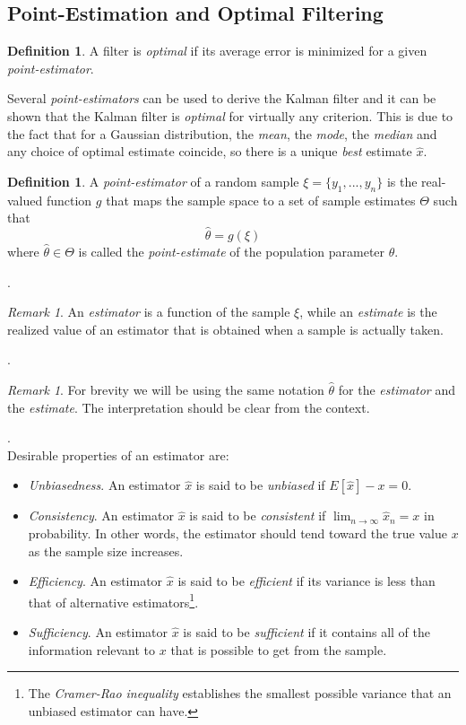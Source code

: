 \documentclass{article}
\theoremstyle{definition}
\newtheorem{definition}[thm]{Definition}
\theoremstyle{remark}
\newtheorem{remark}[thm]{Remark}
\begin{document}
\subsection{Point-Estimation and Optimal Filtering}\label{sec:opfilt}
\begin{definition}
A filter is \emph{optimal} if its average error is minimized for a given \emph{point-estimator}. 
\end{definition}

Several \emph{point-estimators} can be used to derive the Kalman filter and it can be shown that the Kalman filter is \emph{optimal} for virtually any criterion. This is due to the fact that for a Gaussian distribution, the \emph{mean}, the \emph{mode}, the \emph{median} and any choice of optimal estimate coincide, so there is a unique \emph{best} estimate $\hat{x}$.

\begin{definition}
A \emph{point-estimator} of a random sample $\xi=\{y_1,...,y_n\}$ is the real-valued function $g$ that maps the sample space  to a set of sample estimates $\Theta$ such that
$$\hat{\theta}=g(\xi)$$
where $\hat{\theta} \in \Theta$ is called the \emph{point-estimate} of the population parameter $\theta$.
\end{definition}
{\tiny.} 
\begin{remark}
An \emph{estimator} is a function of the sample $\xi$, while an \emph{estimate} is the realized value of an
estimator that is obtained when a sample is actually taken.
\end{remark}
{\tiny.} 
\begin{remark}
For brevity we will be using the same notation $\hat{\theta}$ for the \emph{estimator} and the \emph{estimate}. The interpretation should be clear from the context.
\end{remark}
{\tiny.} 
\\
Desirable properties of an estimator are:
\begin{itemize}
\item \emph{Unbiasedness}. An estimator $\hat{x}$ is said to be \emph{unbiased} if $E[\hat{x}]-x=0$. 
\item \emph{Consistency}. An estimator $\hat{x}$ is said to be \emph{consistent} if $\lim_{n \to \infty} \hat{x}_n=x$ in probability. In other words, the estimator should tend toward the true value $x$ as the sample size increases.
\item \emph{Efficiency}. An estimator $\hat{x}$ is said to be \emph{efficient} if its variance is less than that of alternative estimators\footnote{
The \emph{Cramer-Rao inequality} establishes the smallest possible variance that an unbiased estimator can have.}.
\item \emph{Sufficiency}. An estimator $\hat{x}$ is said to be \emph{sufficient} if it contains all of the information relevant to $x$ that is possible to get from the sample.
\end{itemize}
\end{document}
